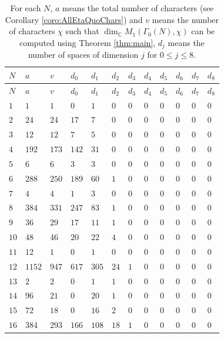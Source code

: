 \documentclass[12pt]{amsart}
\numberwithin{equation}{section}
\theoremstyle{plain}
\theoremstyle{definition}
\theoremstyle{remark}
\newcommand\numC{\mathbb{C}}
\begin{document}
\begin{longtable}{llllllllllll}
\caption{For each $N$, $a$ means the total number of characters (see Corollary \ref{coro:AllEtaQuoChars}) and $v$ means the number of characters $\chi$ such that $\dim_\numC M_{1}(\Gamma_0(N),\chi)$ can be computed using Theorem \ref{thm:main}, $d_j$ means the number of spaces of dimension $j$ for $0\leq j \leq 8$. \label{table:wt1}}\\
\toprule
$N$ & $a$ & $v$ & $d_0$ & $d_1$ & $d_2$ & $d_3$ & $d_4$ & $d_5$ & $d_6$ & $d_7$ & $d_8$ \\
\midrule
\endfirsthead
$N$ & $a$ & $v$ & $d_0$ & $d_1$ & $d_2$ & $d_3$ & $d_4$ & $d_5$ & $d_6$ & $d_7$ & $d_8$ \\
\midrule
\endhead
$1$ & $1$ & $1$ & $0$ & $1$ & $0$ & $0$ & $0$ & $0$ & $0$ & $0$ & $0$\\
$2$ & $24$ & $24$ & $17$ & $7$ & $0$ & $0$ & $0$ & $0$ & $0$ & $0$ & $0$\\
$3$ & $12$ & $12$ & $7$ & $5$ & $0$ & $0$ & $0$ & $0$ & $0$ & $0$ & $0$\\
$4$ & $192$ & $173$ & $142$ & $31$ & $0$ & $0$ & $0$ & $0$ & $0$ & $0$ & $0$\\
$5$ & $6$ & $6$ & $3$ & $3$ & $0$ & $0$ & $0$ & $0$ & $0$ & $0$ & $0$\\
$6$ & $288$ & $250$ & $189$ & $60$ & $1$ & $0$ & $0$ & $0$ & $0$ & $0$ & $0$\\
$7$ & $4$ & $4$ & $1$ & $3$ & $0$ & $0$ & $0$ & $0$ & $0$ & $0$ & $0$\\
$8$ & $384$ & $331$ & $247$ & $83$ & $1$ & $0$ & $0$ & $0$ & $0$ & $0$ & $0$\\
$9$ & $36$ & $29$ & $17$ & $11$ & $1$ & $0$ & $0$ & $0$ & $0$ & $0$ & $0$\\
$10$ & $48$ & $46$ & $20$ & $22$ & $4$ & $0$ & $0$ & $0$ & $0$ & $0$ & $0$\\
$11$ & $12$ & $1$ & $0$ & $1$ & $0$ & $0$ & $0$ & $0$ & $0$ & $0$ & $0$\\
$12$ & $1152$ & $947$ & $617$ & $305$ & $24$ & $1$ & $0$ & $0$ & $0$ & $0$ & $0$\\
$13$ & $2$ & $2$ & $0$ & $1$ & $1$ & $0$ & $0$ & $0$ & $0$ & $0$ & $0$\\
$14$ & $96$ & $21$ & $0$ & $20$ & $1$ & $0$ & $0$ & $0$ & $0$ & $0$ & $0$\\
$15$ & $72$ & $18$ & $0$ & $16$ & $2$ & $0$ & $0$ & $0$ & $0$ & $0$ & $0$\\
$16$ & $384$ & $293$ & $166$ & $108$ & $18$ & $1$ & $0$ & $0$ & $0$ & $0$ & $0$\\

\end{longtable}
\end{document}
